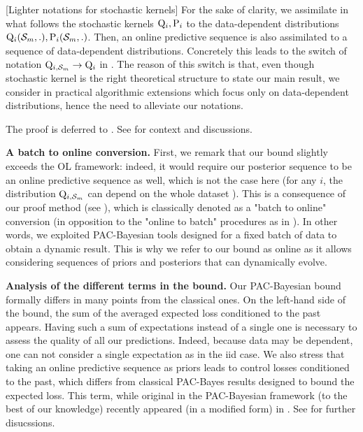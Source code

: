 \begin{remark}
  \label{rem: notations}[Lighter notations for stochastic kernels]
  For the sake of clarity, we assimilate in what follows the stochastic kernels $\mathrm{Q}_{i},\mathrm{P}_{i}$ to the data-dependent distributions $\mathrm{Q}_{i}(\mathcal{S}_m,.), \mathrm{P}_{i}(\mathcal{S}_m,.)$. Then, an online predictive sequence is also assimilated to a sequence of data-dependent distributions. Concretely this leads to the switch of notation $\mathrm{Q}_{i,\mathcal{S}_m}\rightarrow \mathrm{Q}_{i}$ in . The reason of this switch is that, even though stochastic kernel is the right theoretical structure to state our main result, we consider in  practical algorithmic extensions which focus only on data-dependent distributions, hence the need to alleviate our notations.
\end{remark}

The proof is deferred to . See  for context and discussions.

\textbf{A batch to online conversion.}
   First, we remark that our bound slightly exceeds the OL framework: indeed, it would require our posterior sequence to be an online predictive sequence as well, which is not the case here (for any $i$, the distribution $\mathrm{Q}_{i,\mathcal{S}_m}$ can depend on the whole dataset ). This is a consequence of our proof method (see ), which is classically denoted as a "batch to online" conversion (in opposition to the "online to batch" procedures as in \citealp{dekel2005data}). In other words, we exploited PAC-Bayesian tools designed for a fixed batch of data to obtain a dynamic result. This is why we refer to our bound as online as it allows considering sequences of priors and posteriors that can dynamically evolve.



\textbf{Analysis of the different terms in the bound.}
Our PAC-Bayesian bound formally differs in many points from the classical ones.
  On the left-hand side of the bound, the sum of the averaged expected loss conditioned to the past appears. Having such a sum of expectations instead of a single one is necessary to assess the quality of all our predictions. Indeed, because data may be dependent, one can not consider a single expectation as in the iid case. We also stress that taking an online predictive sequence as priors leads to control losses conditioned to the past, which differs from classical PAC-Bayes results designed to bound the expected loss. This term, while original in the PAC-Bayesian framework (to the best of our knowledge) recently appeared (in a modified form) in \citet[Prop 3]{wintenberger2021stochastic}. See  for further disucssions.

